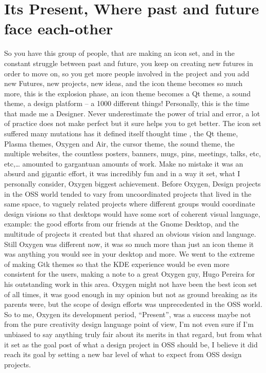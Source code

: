 \section*{Its Present, Where past and future face each-other}
So you have this group of people, that are making an icon set, and in the constant struggle between past and future, you keep on creating new futures in order to move on, so you get more people involved in the project and you add new Futures, new projects, new ideas, and the icon theme becomes so much more, this is the explosion phase, an icon theme becomes a Qt theme, a sound theme, a design platform – a 1000 different things! 
Personally, this is the time that made me a Designer. Never underestimate the power of trial and error, a lot of practice does not make perfect but it sure helps you to get better.
The icon set suffered many mutations has it defined itself thought time , the Qt theme, Plasma themes, Oxygen and Air, the cursor theme, the sound theme, the multiple websites, the countless posters, banners, mugs, pins, meetings, talks, etc, etc,… amounted to gargantuan amounts of work. 
Make no mistake it was an absurd and gigantic effort, it was incredibly fun and in a way it set, what I personally consider, Oxygen biggest achievement.
Before Oxygen, Design projects in the OSS world tended to vary from uncoordinated projects that lived in the same space, to vaguely related projects where different groups would coordinate design visions so that desktops would have some sort of coherent visual language, example: the good efforts from our friends at the Gnome Desktop, and the multitude of projects it created but that shared an obvious vision and language.
Still Oxygen was different now, it was so much more than just an icon theme it was anything you would see in your desktop and more. We went to the extreme of making Gtk themes so that the KDE experience would be even more consistent for the users, making a note to a great Oxygen guy, Hugo Pereira for his outstanding work in this area.
Oxygen might not have been the best icon set of all times, it was good enough in my opinion but not as ground breaking as its parents were, but the scope of design efforts was unprecedented in the OSS world. 
So to me, Oxygen its development period, “Present”,  was a success maybe not from the pure creativity design language point of view, I'm not even sure if I'm unbiased to say anything truly fair about its merits in that regard, but from what it set as the goal post of what a design project in OSS should be, I believe it did reach its goal by setting a new bar level of what to expect from OSS design projects.

